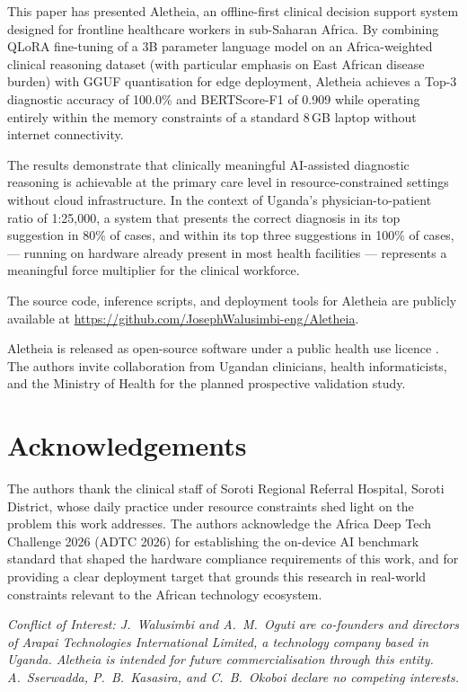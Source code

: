 \documentclass[journal]{IEEEtran}
\begin{document}
This paper has presented Aletheia, an offline-first clinical
decision support system designed for frontline healthcare workers
in sub-Saharan Africa. By combining QLoRA fine-tuning of a 3B
parameter language model on an Africa-weighted clinical reasoning dataset
(with particular emphasis on East African disease burden) with GGUF quantisation for edge deployment,
Aletheia achieves a Top-3 diagnostic accuracy of 100.0\% and
BERTScore-F1 of 0.909 while operating entirely within the memory
constraints of a standard 8\,GB laptop without internet
connectivity.

The results demonstrate that clinically meaningful AI-assisted
diagnostic reasoning is achievable at the primary care level in
resource-constrained settings without cloud infrastructure. In
the context of Uganda's physician-to-patient ratio of 1:25{,}000,
a system that presents the correct diagnosis in its top suggestion
in 80\% of cases, and within its top three suggestions in 100\% of cases, --- running on hardware already present in most
health facilities --- represents a meaningful force multiplier for
the clinical workforce.

The source code, inference scripts, and deployment tools for
Aletheia are publicly available at
\url{https://github.com/JosephWalusimbi-eng/Aletheia}.

Aletheia is released as open-source software under a public
health use licence \cite{aletheia_github}. The authors invite collaboration from Ugandan
clinicians, health informaticists, and the Ministry of Health for
the planned prospective validation study.

\section*{Acknowledgements}

The authors thank the clinical staff of Soroti Regional Referral
Hospital, Soroti District, whose daily practice under resource
constraints shed light on the problem this work addresses. The authors acknowledge the Africa Deep
Tech Challenge 2026 (ADTC 2026) for establishing the on-device
AI benchmark standard that shaped the hardware compliance
requirements of this work, and for providing a clear deployment
target that grounds this research in real-world constraints
relevant to the African technology ecosystem.

\textit{\textit{Conflict of Interest}: J.~Walusimbi and A.~M.~Oguti are
co-founders and directors of Arapai Technologies International Limited, a technology company based in Uganda. Aletheia is
intended for future commercialisation through this entity.
A.~Sserwadda, P.~B.~Kasasira, and C.~B.~Okoboi declare no
competing interests.}
\end{document}
